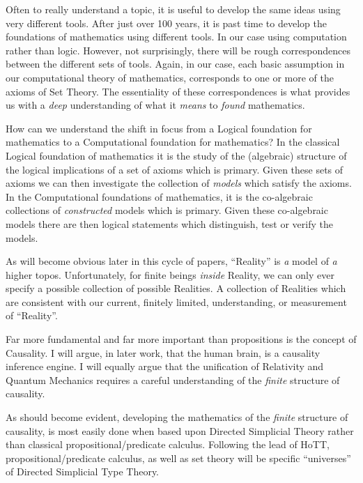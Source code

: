 \documentclass[a4paper,openany]{amsbook}
\begin{document}
Often to really understand a topic, it is useful to develop the same ideas using very
different tools. After just over 100 years, it is past time to develop the foundations of
mathematics using different tools.  In our case using computation rather than logic.
However, not surprisingly, there will be rough correspondences between the different sets
of tools. Again, in our case, each basic assumption in our computational theory of
mathematics, corresponds to one or more of the axioms of Set Theory. The essentiality of
these correspondences is what provides us with a \emph{deep} understanding of what it
\emph{means} to \emph{found} mathematics.

How can we understand the shift in focus from a Logical foundation for
mathematics to a Computational foundation for mathematics? In the classical
Logical foundation of mathematics it is the study of the (algebraic) structure
of the logical implications of a set of axioms which is primary. Given these
sets of axioms we can then investigate the collection of \emph{models} which
satisfy the axioms. In the Computational foundations of mathematics, it is the
co-algebraic collections of \emph{constructed} models which is primary.  Given
these co-algebraic models there are then logical statements which distinguish,
test or verify the models.


As will become obvious later in this cycle of papers, ``Reality'' is \emph{a}
model of \emph{a} higher topos.  Unfortunately, for finite beings \emph{inside}
Reality, we can only ever specify a possible collection of possible Realities. A
collection of Realities which are consistent with our current, finitely limited,
understanding, or measurement of ``Reality''.

Far more fundamental and far more important than propositions is the concept of
Causality.  I will argue, in later work, that the human brain, is a causality
inference engine. I will equally argue that the unification of Relativity and
Quantum Mechanics requires a careful understanding of the \emph{finite}
structure of causality.

As should become evident, developing the mathematics of the \emph{finite}
structure of causality, is most easily done when based upon Directed Simplicial
Theory rather than classical propositional/predicate calculus. Following the
lead of HoTT, propositional/predicate calculus, as well as set theory will be
specific ``universes'' of Directed Simplicial Type Theory.
\end{document}
